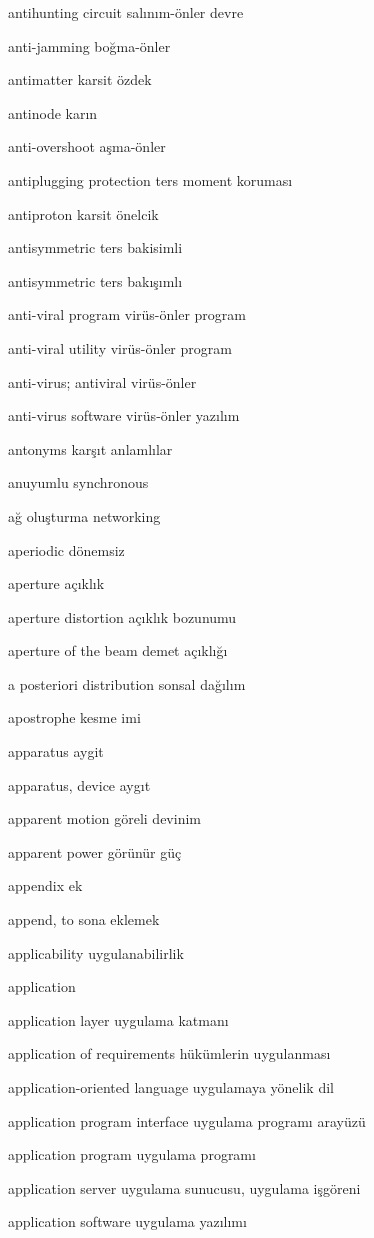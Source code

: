 \documentclass[12pt,fleqn]{article}\usepackage{../../common}
\begin{document}
antihunting circuit salınım-önler devre

anti-jamming boğma-önler

antimatter karsit özdek

antinode karın

anti-overshoot aşma-önler

antiplugging protection ters moment koruması

antiproton karsit önelcik

antisymmetric ters bakisimli

antisymmetric ters bakışımlı

anti-viral program virüs-önler program

anti-viral utility virüs-önler program

anti-virus; antiviral virüs-önler

anti-virus software virüs-önler yazılım

antonyms karşıt anlamlılar

anuyumlu synchronous

ağ oluşturma networking

aperiodic dönemsiz

aperture açıklık

aperture distortion açıklık bozunumu

aperture of the beam demet açıklığı

a posteriori distribution sonsal dağılım

apostrophe kesme imi

apparatus aygit

apparatus, device aygıt

apparent motion göreli devinim

apparent power görünür güç

appendix ek

append, to sona eklemek

applicability uygulanabilirlik

application

application layer uygulama katmanı

application of requirements hükümlerin uygulanması

application-oriented language uygulamaya yönelik dil

application program interface uygulama programı arayüzü

application program uygulama programı

application server uygulama sunucusu, uygulama işgöreni

application software uygulama yazılımı
\end{document}
